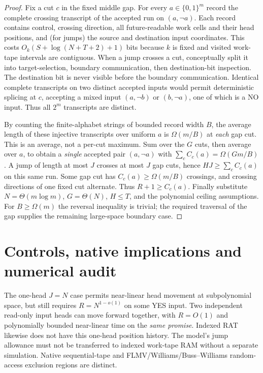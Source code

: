 \documentclass[11pt]{article}
\begin{document}
\begin{proof}
Fix a cut $c$ in the fixed middle gap.
For every $a\in\{0,1\}^m$ record the complete crossing transcript
of the accepted run on $(a,\neg a)$. Each record contains control,
crossing direction, all future-readable work cells and their head positions,
and (for jumps) the source and destination input coordinates.
This costs $O_k(S+\log(N+T+2)+1)$ bits because $k$ is fixed
and visited work-tape intervals are contiguous.
When a jump crosses a cut, conceptually split it into
target-selection, boundary communication, then destination-bit inspection.
The destination bit is never visible before the boundary communication.
Identical complete transcripts on two distinct accepted inputs would
permit deterministic splicing at $c$, accepting a mixed input
$(a,\neg b)$ or $(b,\neg a)$, one of which is a NO input.
Thus all $2^m$ transcripts are distinct.

By counting the finite-alphabet strings of bounded record width $B$,
the average length of these injective transcripts over uniform $a$
is $\Omega(m/B)$ at \emph{each} gap cut.
This is an average, not a per-cut maximum.
Sum over the $G$ cuts, then average over $a$,
to obtain a \emph{single} accepted pair $(a,\neg a)$ with
$\sum_c C_c(a)=\Omega(Gm/B)$.
A jump of length at most $J$ crosses at most $J$ gap cuts,
hence $HJ\ge\sum_c C_c(a)$ on this same run.
Some gap cut has $C_c(a)\ge \Omega(m/B)$ crossings,
and crossing directions of one fixed cut alternate.
Thus $R+1\ge C_c(a)$.
Finally substitute $N=\Theta(m\log m)$, $G=\Theta(N)$,
$H\le T$, and the polynomial ceiling assumptions.
For $B\ge\Omega(m)$ the reversal inequality is trivial;
the required traversal of the gap supplies the remaining
large-space boundary case.
\end{proof}

\section{Controls, native implications and numerical audit}
The one-head $J=N$ case permits near-linear head movement at
subpolynomial space, but still requires $R=N^{1-o(1)}$
on some YES input. Two independent read-only input heads
can move forward together, with $R=O(1)$ and polynomially bounded
near-linear time on the \emph{same promise}.
Indexed RAT likewise does not have this one-head position history.
The model's jump allowance must not be transferred to indexed
work-tape RAM without a separate simulation.
Native sequential-tape and FLMV/Williams/Buss--Williams
random-access exclusion regions are distinct.
\end{document}
